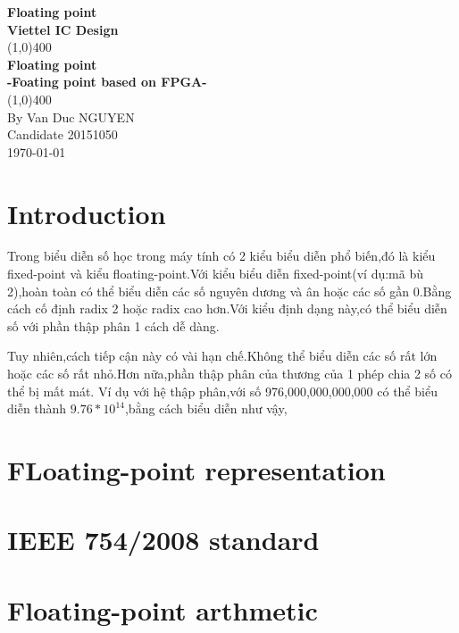 \documentclass[13pt,a4paper,vietnamese]{report}
\begin{document}
\begin{titlepage}
\begin{center}
\vspace*{1cm}
\Large\textbf{Floating point}\\
\large\textbf{Viettel IC Design}\\
\vfill
\line(1,0){400}\\[1mm]
\huge{\textbf{Floating point}}\\[3mm]
\Large{\textbf{-Foating point based on FPGA-}}\\[1mm]
\line(1,0){400}\\
\vfill
By Van Duc NGUYEN\\
Candidate 20151050 \\
\today
\end{center}
\end{titlepage}
	
\tableofcontents

\thispagestyle{empty}
\clearpage

\setcounter{page}{1}
\chapter{Introduction}
Trong biểu diễn số học trong máy tính có 2 kiểu biểu diễn phổ biến,đó là kiểu fixed-point và kiểu floating-point.Với kiểu biểu diễn fixed-point(ví dụ:mã bù 2),hoàn toàn có thể biểu diễn các số nguyên dương và ân hoặc các số gần 0.Bằng cách cố định radix 2 hoặc radix cao hơn.Với kiểu định dạng này,có thể biểu diễn số với phần thập phân 1 cách dễ dàng.

Tuy nhiên,cách tiếp cận này có vài hạn chế.Không thể biểu diễn các số rất lớn hoặc các số rất nhỏ.Hơn nữa,phần thập phân của thương của 1 phép chia 2 số có thể bị mất mát.
Ví dụ với hệ thập phân,với số 976,000,000,000,000 có thể biểu diễn thành $9.76*10^{14}$,bằng cách biểu diễn như vậy,
\chapter{FLoating-point representation}

\chapter{IEEE 754/2008 standard}

\chapter{Floating-point arthmetic}
\end{document}
